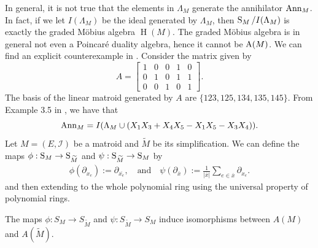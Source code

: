 \documentclass{puthesis-UG}
\begin{document}
In general, it is not true that the elements in $\Lambda_M$ generate the annihilator $\operatorname{Ann}_M$. In fact, if we let $I(\Lambda_M)$ be the ideal generated by $\Lambda_M$, then $\operatorname{S}_M / I(\Lambda_M)$ is exactly the graded M\"obius algebra $\operatorname{H}(M)$. The graded M\"obius algebra is in general not even a Poincar\'e duality algebra, hence it cannot be $\operatorname{A}(M)$. We can find an explicit counterexample in \cite{MN-gorenstein}. Consider the matrix given by 
\[
	A = \begin{bmatrix}
		1 & 0 & 0 & 1 & 0 \\
		0 & 1 & 0 & 1 & 1 \\
		0 & 0 & 1 & 0 & 1
	\end{bmatrix}.
\]
The basis of the linear matroid generated by $A$ are $\{123, 125, 134, 135, 145\}$. From Example 3.5 in \cite{MN-gorenstein}, we have that 
\[
	\operatorname{Ann}_M =  I(\Lambda_M \cup (X_1X_3 + X_4X_5 - X_1X_5 - X_3X_4)).
\]
Let $M = (E, \mathcal{I})$ be a matroid and $\widetilde{M}$ be its simplification. We can define the maps $\phi : \operatorname{S}_M \to \operatorname{S}_{\widetilde{M}}$ and $\psi : \operatorname{S}_{\widetilde{M}} \to \operatorname{S}_M$ by 
\begin{align*}
	\phi (\partial_{x_e}) := \partial_{\overline{x_e}}, \quad \text{and} \quad \psi (\partial_{\overline{x}}) := \frac{1}{|\overline{x}|} \sum_{e \in \overline{x}} \partial_{x_e}.
\end{align*}
and then extending to the whole polynomial ring using the universal property of polynomial rings.

\begin{thm} \label{only-simplification-matters}
	The maps $\phi : S_M \to S_{\widetilde{M}}$ and $\psi : S_{\widetilde{M}} \to S_M$ induce isomorphisms between $A(M)$ and $A(\widetilde{M})$. 
\end{thm}
\end{document}

